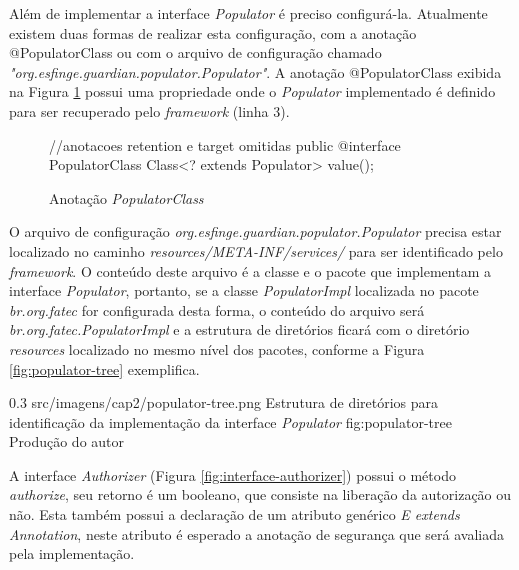 \par Além de implementar a interface \textit{Populator} é preciso configurá-la. Atualmente existem duas formas de realizar esta configuração, com a anotação @PopulatorClass ou com o arquivo de configuração chamado \textit{"org.esfinge.guardian.populator.Populator"}. A anotação @PopulatorClass exibida na Figura \ref{fig:populator-class} possui uma propriedade onde o \textit{Populator} implementado é definido para ser recuperado pelo \textit{framework} (linha 3).

\begin{figure}[H]
    \centering
    \caption{Anotação \textit{PopulatorClass}}
    \begin{java}
//anotacoes retention e target omitidas
public @interface PopulatorClass {
	Class<? extends Populator> value();
}
    \end{java}
    \label{fig:populator-class}
\end{figure}

\par O arquivo de configuração \textit{org.esfinge.guardian.populator.Populator} precisa estar localizado no caminho \textit{resources/META-INF/services/} para ser identificado pelo \textit{framework}. O conteúdo deste arquivo é a classe e o pacote que implementam a interface \textit{Populator}, portanto, se a classe \textit{PopulatorImpl} localizada no pacote \textit{br.org.fatec} for configurada desta forma, o conteúdo do arquivo será \textit{br.org.fatec.PopulatorImpl} e a estrutura de diretórios ficará com o diretório \textit{resources} localizado no mesmo nível dos pacotes, conforme a Figura \ref{fig:populator-tree} exemplifica.

\begin{image}
{0.3} %
{src/imagens/cap2/populator-tree.png} %
{Estrutura de diretórios para identificação da implementação da interface \textit{Populator}} %
{fig:populator-tree} %
{Produção do autor} %
\end{image}

\par A interface \textit{Authorizer} (Figura \ref{fig:interface-authorizer}) possui o método \textit{authorize}, seu retorno é um booleano, que consiste na liberação da autorização ou não. Esta também possui a declaração de um atributo genérico \textit{E extends Annotation}, neste atributo é esperado a anotação de segurança que será avaliada pela implementação. 


